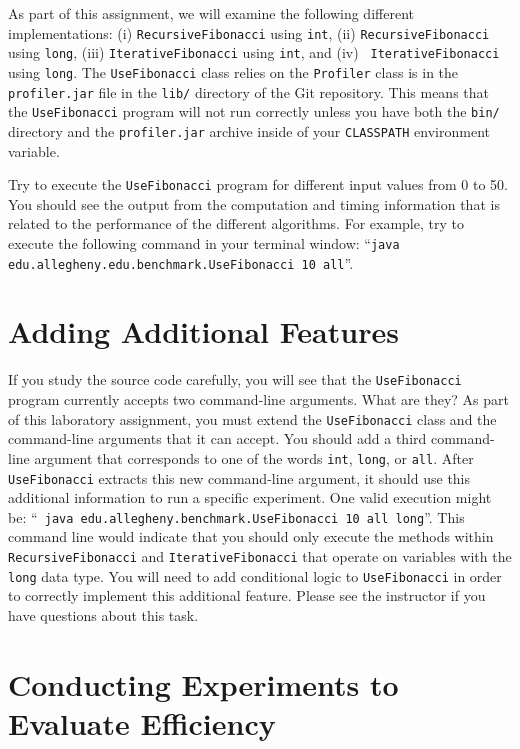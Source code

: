 \begin{sloppypar}
As part of this assignment, we will examine the following different implementations: (i) {\tt RecursiveFibonacci} using
{\tt int}, (ii) {\tt RecursiveFibonacci} using {\tt long}, (iii) {\tt IterativeFibonacci} using {\tt int}, and (iv) {\tt
  IterativeFibonacci} using {\tt long}. The {\tt UseFibonacci} class relies on the {\tt Profiler} class is in the {\tt
  profiler.jar} file in the {\tt lib/} directory of the Git repository.  This means that the {\tt UseFibonacci} program
will not run correctly unless you have both the {\tt bin/} directory and the {\tt profiler.jar} archive inside of your
{\tt CLASSPATH} environment variable.
\end{sloppypar}

Try to execute the {\tt UseFibonacci} program for different input values from 0 to 50. You should see the output from
the computation and timing information that is related to the performance of the different algorithms. For example, try
to execute the following command in your terminal window: ``{\tt java edu.allegheny.edu.benchmark.UseFibonacci 10 all}''.

\section*{Adding Additional Features}

  If you study the source code carefully, you will see that the {\tt UseFibonacci} program currently accepts two
  command-line arguments. What are they? As part of this laboratory assignment, you must extend the {\tt UseFibonacci}
  class and the command-line arguments that it can accept. You should add a third command-line argument that corresponds
  to one of the words {\tt int}, {\tt long}, or {\tt all}. After {\tt UseFibonacci} extracts this new command-line
  argument, it should use this additional information to run a specific experiment. One valid execution might be: ``{\tt
    java edu.allegheny.benchmark.Use\-Fibonacci 10 all long}''. This command line would indicate that you should only
  execute the methods within {\tt RecursiveFibonacci} and {\tt IterativeFibonacci} that operate on variables with the
  {\tt long} data type.  You will need to add conditional logic to {\tt UseFibonacci} in order to correctly
  implement this additional feature. Please see the instructor if you have questions about this task.

\section*{Conducting Experiments to Evaluate Efficiency}

